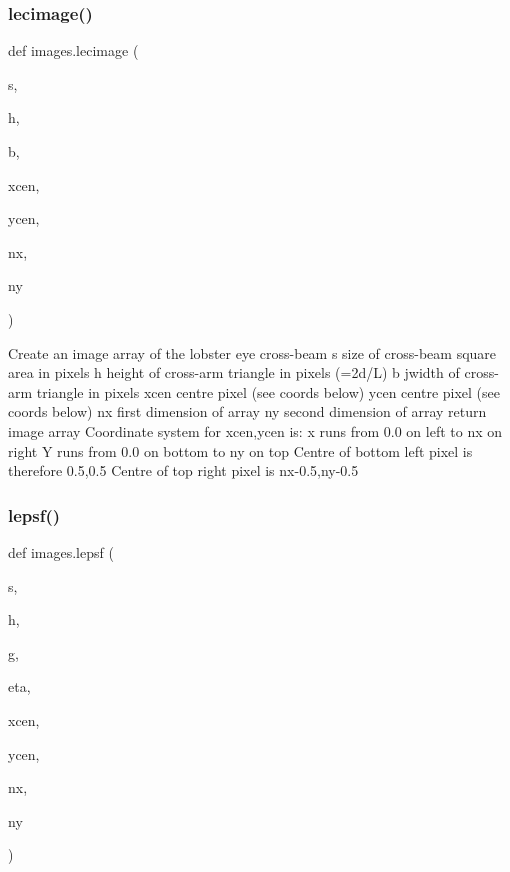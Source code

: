 \subsubsection{\texorpdfstring{lecimage()}{lecimage()}}
{\footnotesize\ttfamily def images.\+lecimage (\begin{DoxyParamCaption}\item[{}]{s,  }\item[{}]{h,  }\item[{}]{b,  }\item[{}]{xcen,  }\item[{}]{ycen,  }\item[{}]{nx,  }\item[{}]{ny }\end{DoxyParamCaption})}

\begin{DoxyVerb}Create an image array of the lobster eye cross-beam
    s       size of cross-beam square area in pixels
    h       height of cross-arm triangle in pixels (=2d/L)
    b       jwidth of cross-arm triangle in pixels
    xcen    centre pixel (see coords below)
    ycen    centre pixel (see coords below)
    nx      first dimension of array
    ny      second dimension of array
return  image array
    Coordinate system for xcen,ycen is:
    x runs from 0.0 on left to nx on right
    Y runs from 0.0 on bottom to ny on top
    Centre of bottom left pixel is therefore 0.5,0.5
    Centre of top right pixel is nx-0.5,ny-0.5
\end{DoxyVerb}
 \mbox{\label{namespaceimages_abf1baa121ee75e999c92c7f23b7dc42e}} 
\subsubsection{\texorpdfstring{lepsf()}{lepsf()}}
{\footnotesize\ttfamily def images.\+lepsf (\begin{DoxyParamCaption}\item[{}]{s,  }\item[{}]{h,  }\item[{}]{g,  }\item[{}]{eta,  }\item[{}]{xcen,  }\item[{}]{ycen,  }\item[{}]{nx,  }\item[{}]{ny }\end{DoxyParamCaption})}

